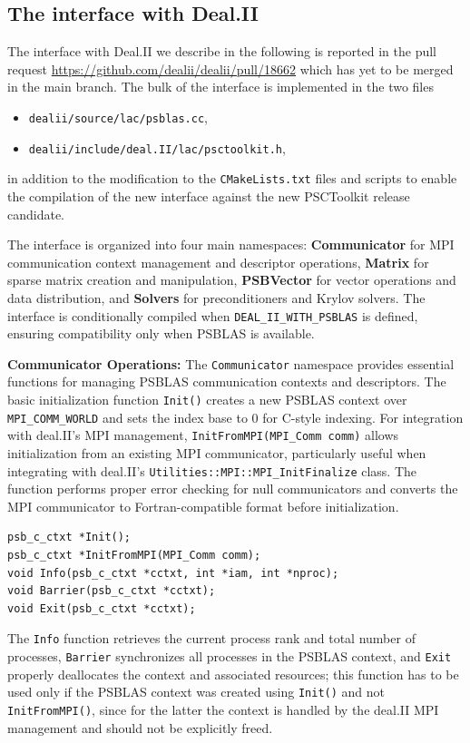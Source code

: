 \documentclass[a4paper,12pt]{article}
\begin{document}
\subsection{The interface with Deal.II}

The interface with Deal.II we describe in the following is reported in the pull request
\url{https://github.com/dealii/dealii/pull/18662} which has yet to be merged in the main branch.
The bulk of the interface is implemented in the two files
\begin{itemize}
    \item \texttt{dealii/source/lac/psblas.cc},
    \item \texttt{dealii/include/deal.II/lac/psctoolkit.h},
\end{itemize}
in addition to the modification to the \texttt{CMakeLists.txt} files and scripts to enable the
compilation of the new interface against the new PSCToolkit release candidate.

The interface is organized into four main namespaces: \textbf{Communicator} for MPI communication
context management and descriptor operations, \textbf{Matrix} for sparse matrix creation and manipulation,
\textbf{PSBVector} for vector operations and data distribution, and \textbf{Solvers} for preconditioners
and Krylov solvers. The interface is conditionally compiled when \texttt{DEAL\_II\_WITH\_PSBLAS}
is defined, ensuring compatibility only when PSBLAS is available.

\textbf{Communicator Operations:} The \texttt{Communicator} namespace provides essential functions
for managing PSBLAS communication contexts and descriptors. The basic initialization function
\texttt{Init()} creates a new PSBLAS context over \texttt{MPI\_COMM\_WORLD} and sets the index
base to 0 for C-style indexing. For integration with deal.II's MPI management,
\lstinline{InitFromMPI(MPI_Comm comm)} allows initialization from an existing MPI communicator,
particularly useful when integrating with deal.II's \lstinline{Utilities::MPI::MPI_InitFinalize} class.
The function performs proper error checking for null communicators and converts the MPI communicator to
Fortran-compatible format before initialization.
\begin{lstlisting}[caption=Core communicator functions]
psb_c_ctxt *Init();
psb_c_ctxt *InitFromMPI(MPI_Comm comm);
void Info(psb_c_ctxt *cctxt, int *iam, int *nproc);
void Barrier(psb_c_ctxt *cctxt);
void Exit(psb_c_ctxt *cctxt);
\end{lstlisting}
The \texttt{Info} function retrieves the current process rank and total number of processes,
\texttt{Barrier} synchronizes all processes in the PSBLAS context, and \texttt{Exit} properly deallocates
the context and associated resources; this function has to be used only if the PSBLAS context was created
using \texttt{Init()} and not \texttt{InitFromMPI()}, since for the latter the context is handled by the
deal.II MPI management and should not be explicitly freed.
\end{document}
